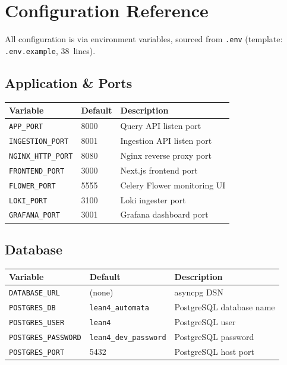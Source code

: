 
\section{Configuration Reference}
\label{sec:configuration}

All configuration is via environment variables, sourced from \texttt{.env}
(template: \texttt{.env.example}, 38~lines).

\subsection{Application \& Ports}

\begin{longtable}{@{}llp{5.5cm}@{}}
\toprule
\textbf{Variable} & \textbf{Default} & \textbf{Description} \\
\midrule
\endfirsthead
\bottomrule
\endfoot
\texttt{APP\_PORT}         & 8000  & Query API listen port \\
\texttt{INGESTION\_PORT}   & 8001  & Ingestion API listen port \\
\texttt{NGINX\_HTTP\_PORT} & 8080  & Nginx reverse proxy port \\
\texttt{FRONTEND\_PORT}    & 3000  & Next.js frontend port \\
\texttt{FLOWER\_PORT}      & 5555  & Celery Flower monitoring UI \\
\texttt{LOKI\_PORT}        & 3100  & Loki ingester port \\
\texttt{GRAFANA\_PORT}     & 3001  & Grafana dashboard port \\
\end{longtable}

\subsection{Database}

\begin{longtable}{@{}llp{5.5cm}@{}}
\toprule
\textbf{Variable} & \textbf{Default} & \textbf{Description} \\
\midrule
\endfirsthead
\bottomrule
\endfoot
\texttt{DATABASE\_URL}       & (none)                   & asyncpg DSN \\
\texttt{POSTGRES\_DB}        & \texttt{lean4\_automata}  & PostgreSQL database name \\
\texttt{POSTGRES\_USER}      & \texttt{lean4}            & PostgreSQL user \\
\texttt{POSTGRES\_PASSWORD}  & \texttt{lean4\_dev\_password} & PostgreSQL password \\
\texttt{POSTGRES\_PORT}      & 5432                     & PostgreSQL host port \\
\end{longtable}

